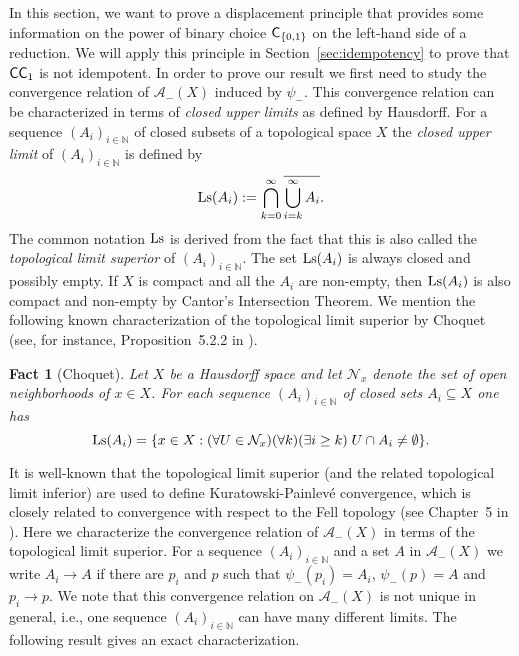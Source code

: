 \documentclass[a4paper]{amsart}
\def\AA{{\mathcal A}}
\def\NN{{\mathcal N}}
\def\IN{{\mathbb{N}}}
\def\In{\subseteq}
\def\Ls{{\rm Ls}}
\def\C{\mbox{\rm\sffamily C}}
\def\ConC{\mbox{\rm\sffamily CC}}
\newtheorem{fact}[theorem]{Fact}
\theoremstyle{definition}
\begin{document}
In this section, we want to prove a displacement principle that provides some information on the
power of binary choice $\C_{\{0,1\}}$ on the left-hand side of a reduction. 
We will apply this principle in Section~\ref{sec:idempotency} to prove that $\ConC_1$ is not idempotent.
In order to 
prove our result we first need to study the convergence relation of $\AA_-(X)$ induced by $\psi_-$.
This convergence relation can be characterized in terms of {\em closed upper limits} as defined by Hausdorff. 
For a sequence $(A_i)_{i\in\IN}$ of closed subsets of a topological space $X$ 
the {\em closed upper limit} of $(A_i)_{i\in\IN}$ is defined by
\[\Ls(A_i):=\bigcap_{k=0}^\infty\overline{\bigcup_{i=k}^\infty A_i}.\]
The common notation $\Ls$ is derived from the fact that this is also called the 
{\em topological limit superior} of $(A_i)_{i\in\IN}$. The set $\Ls(A_i)$ is always closed and possibly empty. 
If $X$ is compact and all the $A_i$ are non-empty, then $\Ls(A_i)$ is also compact and non-empty
by Cantor's Intersection Theorem.
We mention the following known characterization of the topological limit superior by Choquet 
(see, for instance, Proposition~5.2.2 in \cite{Bee93}).

\begin{fact}[Choquet]
\label{fact:Ls}
Let $X$ be a Hausdorff space and let $\NN_x$ denote the set of open neighborhoods of $x\in X$. For each
sequence $(A_i)_{i\in\IN}$ of closed sets $A_i\In X$ one has
\[\Ls(A_i)=\{x\in X:(\forall U\in\NN_x)(\forall k)(\exists i\geq k)\;U\cap A_i\not=\emptyset\}.\] 
\end{fact}

It is well-known that the topological limit superior (and the related topological limit inferior) are
used to define Kuratowski-Painlev\'e convergence, which is closely related to convergence with respect to the Fell topology 
(see Chapter~5 in \cite{Bee93}). 
Here we characterize the convergence relation of $\AA_-(X)$ in terms of the topological limit superior.
For a sequence $(A_i)_{i\in\IN}$ and a set $A$ in $\AA_-(X)$ we write $A_i\to A$ if there are $p_i$ and $p$
such that $\psi_-(p_i)=A_i$, $\psi_-(p)=A$ and $p_i\to p$. We note that this convergence relation on $\AA_-(X)$
is not unique in general, i.e., one sequence $(A_i)_{i\in\IN}$ can have many different limits. The following result
gives an exact characterization.
\end{document}
